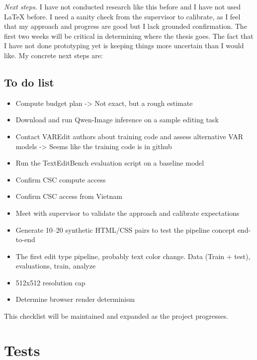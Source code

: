 \textit{Next steps.} I have not conducted research like this before and I have not used LaTeX before. I need a sanity check from the supervisor to calibrate, as I feel that my approach and progress are good but I lack grounded confirmation. The first two weeks will be critical in determining where the thesis goes. The fact that I have not done prototyping yet is keeping things more uncertain than I would like. My concrete next steps are:

\section{To do list} \label{To do list}


\begin{itemize}

  \item[$\boxtimes$] Compute budget plan -> Not exact, but a rough estimate
  \item[$\boxtimes$] Download and run Qwen-Image inference on a sample editing task
  \item[$\boxtimes$] Contact VAREdit authors about training code and assess alternative VAR models -> Seems like the training code is in github
  \item[$\square$] Run the TextEditBench evaluation script on a baseline model
  \item[$\boxtimes$] Confirm CSC compute access
  \item[$\square$] Confirm CSC access from Vietnam
  \item[$\boxtimes$] Meet with supervisor to validate the approach and calibrate expectations
  \item[$\square$] Generate 10–20 synthetic HTML/CSS pairs to test the pipeline concept end-to-end
  \item[$\square$] The first edit type pipeline, probably text color change. Data (Train + test), evaluations, train, analyze
  \item[$\square$] 512x512 resolution cap
  \item[$\square$] Determine browser render determinism
\end{itemize}

\noindent This checklist will be maintained and expanded as the project progresses.

\chapter{Tests} \label{Tests}

